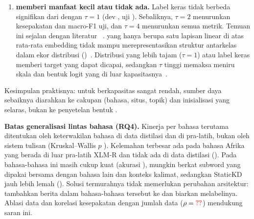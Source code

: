 \begin{enumerate}
  Ablasi embedding beku memperlihatkan sisi lain dari mekanisme yang sama.  menggeser embedding token dari bahasa yang ada di data distilasi. Akibatnya kecocokan in-distribusi naik (dev  bila dibekukan), tetapi token bahasa lain tertinggal di ruang potion yang asli, sehingga kepala linear yang sudah menyesuaikan diri dengan ruang baru kurang cocok untuk token-token itu. Di bahasa tanpa atau dengan sedikit data distilasi, embedding beku lebih baik sebesar  dan . Ini adalah bentuk pergeseran representasi () akibat  pada sebagian kosakata. Resep final tetap memakai  karena resep dipilih pada set  yang berbahasa latih. Namun untuk penggunaan yang menargetkan bahasa tanpa data distilasi, varian beku atau regularisasi yang menahan embedding dekat ke potion adalah pilihan yang lebih aman. Keduanya tetap dapat dilipat menjadi tabel.
  \item \textbf{ memberi manfaat kecil atau tidak ada.} Label keras  tidak berbeda signifikan dari  dengan $\tau=1$ (dev , uji ). Sebaliknya, $\tau=2$ menurunkan kesepakatan  dan macro-F1 uji, dan $\tau=4$ menurunkan semua metrik. Temuan ini sejalan dengan literatur ~\cite{cho2019efficacy,zhang2025law,wang2026rckd}.  yang hanya berupa satu lapisan linear di atas rata-rata embedding tidak mampu merepresentasikan struktur antarkelas dalam ekor distribusi  ()~\cite{zhao2022dkd,huang2022dist}. Distribusi yang lebih tajam ($\tau=1$) atau label keras memberi target yang dapat dicapai, sedangkan $\tau$ tinggi memaksa  meniru skala dan bentuk logit yang di luar kapasitasnya~\cite{sun2024logit}.
\end{enumerate}
Kesimpulan praktisnya: untuk  berkapasitas sangat rendah, sumber daya sebaiknya diarahkan ke cakupan  (bahasa, situs, topik) dan inisialisasi yang selaras, bukan ke penyetelan bentuk .

\textbf{Batas generalisasi lintas bahasa (RQ4).} Kinerja per bahasa terutama ditentukan oleh keterwakilan bahasa di data distilasi dan di pra-latih, bukan oleh sistem tulisan (Kruskal--Wallis $p$ ). Kelemahan terbesar ada pada bahasa Afrika yang berada di luar pra-latih XLM-R dan tidak ada di data distilasi (). Pada bahasa-bahasa ini  masih cukup kuat (akurasi ), mungkin berkat subword yang dipakai bersama dengan bahasa lain dan konteks kalimat, sedangkan StaticKD jauh lebih lemah (). Solusi termurahnya tidak memerlukan perubahan arsitektur: tambahkan berita dalam bahasa-bahasa tersebut ke  dan biarkan  melabelinya. Ablasi data dan korelasi kesepakatan dengan jumlah data ($\rho=\val{fac.data.rho}$) mendukung saran ini.

